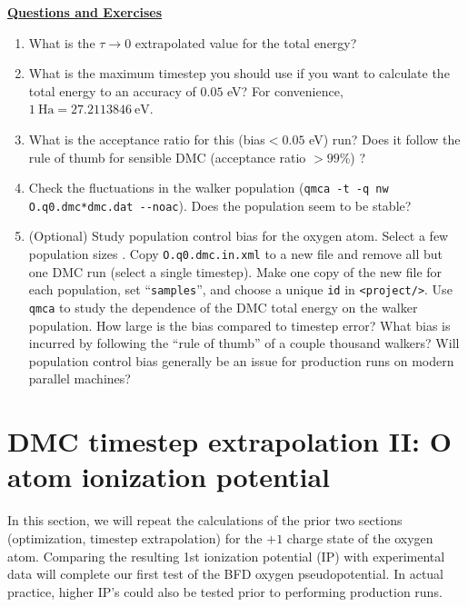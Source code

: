 \vspace{1cm}
\begin{flushleft}
\textbf{\underline{Questions and Exercises}}
\end{flushleft}
\begin{enumerate}
  \item{What is the $\tau\rightarrow 0$ extrapolated value for the total energy?}
  \item{What is the maximum timestep you should use if you want to calculate the total energy to an accuracy of $0.05$ eV?  For convenience, $1~\textrm{Ha}=27.2113846~\textrm{eV}$.}
  \item{What is the acceptance ratio for this (bias$<0.05$ eV) run?  Does it follow the rule of thumb for sensible DMC (acceptance ratio $>99$\%) ?}
  \item{Check the fluctuations in the walker population (\verb|qmca -t -q nw O.q0.dmc*dmc.dat --noac|).  Does the population seem to be stable?}
  \item{(Optional) Study population control bias for the oxygen atom.  Select a few population sizes .  Copy \texttt{O.q0.dmc.in.xml} to a new file and remove all but one DMC run (select a single timestep).  Make one copy of the new file for each population, set ``\texttt{samples}'', and choose a unique \texttt{id} in \texttt{<project/>}.    Use \texttt{qmca} to study the dependence of the DMC total energy on the walker population.  How large is the bias compared to timestep error?  What bias is incurred by following the ``rule of thumb'' of a couple thousand walkers?  Will population control bias generally be an issue for production runs on modern parallel machines?}
\end{enumerate}


\section{DMC timestep extrapolation II: O atom ionization potential}
In this section, we will repeat the calculations of the prior two sections (optimization, timestep extrapolation) for the $+1$ charge state of the oxygen atom.  Comparing the resulting 1st ionization potential (IP) with experimental data will complete our first test of the BFD oxygen pseudopotential.  In actual practice, higher IP's could also be tested prior to performing production runs.

